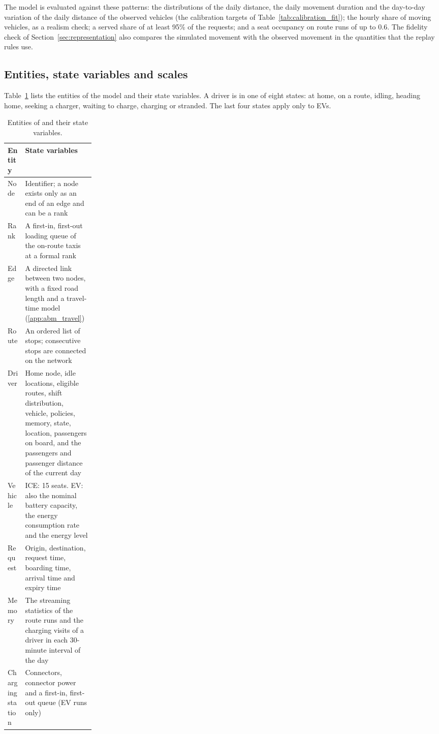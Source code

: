 The model is evaluated against these patterns: the distributions of the daily distance, the daily movement duration and the day-to-day variation of the daily distance of the observed vehicles (the calibration targets of Table~\ref{tab:calibration_fit}); the hourly share of moving vehicles, as a realism check; a served share of at least 95\% of the requests; and a seat occupancy on route runs of up to 0.6. The fidelity check of Section~\ref{sec:representation} also compares the simulated movement with the observed movement in the quantities that the replay rules use.

\subsection{Entities, state variables and scales}
\label{app:abm_entities}

Table~\ref{tab:abm_entities} lists the entities of the model and their state variables. A driver is in one of eight states: at home, on a route, idling, heading home, seeking a charger, waiting to charge, charging or stranded. The last four states apply only to EVs.

\begin{table}[htbp]
    \centering
    \footnotesize
    \caption[Entities of \MA{} and their state variables]{Entities of \MA{} and their state variables.}
    \label{tab:abm_entities}
    \begin{tabularx}{\linewidth}{@{}>{\raggedright\arraybackslash}p{0.2\linewidth}X@{}}
        \toprule
        \textbf{Entity} & \textbf{State variables} \\
        \midrule
        Node & Identifier; a node exists only as an end of an edge and can be a rank \\
        Rank & A first-in, first-out loading queue of the on-route taxis at a formal rank \\
        Edge & A directed link between two nodes, with a fixed road length and a travel-time model (\ref{app:abm_travel}) \\
        Route & An ordered list of stops; consecutive stops are connected on the network \\
        Driver & Home node, idle locations, eligible routes, shift distribution, vehicle, policies, memory, state, location, passengers on board, and the passengers and passenger distance of the current day \\
        Vehicle & ICE: 15 seats. EV: also the nominal battery capacity, the energy consumption rate and the energy level \\
        Request & Origin, destination, request time, boarding time, arrival time and expiry time \\
        Memory & The streaming statistics of the route runs and the charging visits of a driver in each 30-minute interval of the day \\
        Charging station & Connectors, connector power and a first-in, first-out queue (EV runs only) \\
        \bottomrule
    \end{tabularx}
\end{table}

